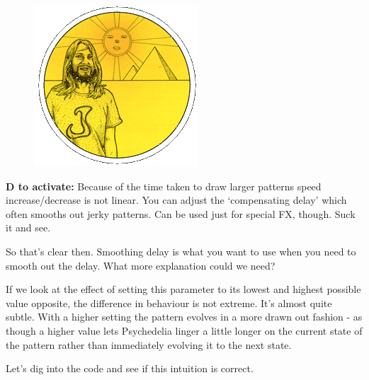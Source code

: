 \begin{definition}
\setlength{\intextsep}{0pt}%
\setlength{\columnsep}{3pt}%
\begin{figure}
\includegraphics[width=\linewidth]{src/callout/psych.png} 
\end{figure}
\small
\textbf{D to activate:} Because of the time taken to
draw larger patterns speed increase/decrease is not linear. You
can adjust the ‘compensating delay’ which often smooths out jerky
patterns. Can be used just for special FX, though. Suck it and see.
\end{definition}

So that's clear then. Smoothing delay is what you want to use when
you need to smooth out the delay. What more explanation could we need?

If we look at the effect of setting this parameter to its lowest and
highest possible value opposite, the difference in behaviour is not
extreme. It's almost quite subtle. With a higher setting the pattern
evolves in a more drawn out fashion - as though a higher value lets
Psychedelia linger a little longer on the current state of the pattern
rather than immediately evolving it to the next state.

Let's dig into the code and see if this intuition is correct.

